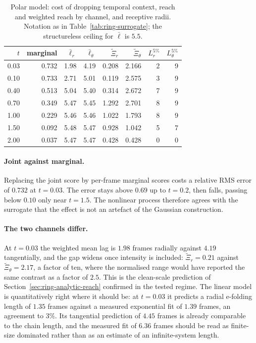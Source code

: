 \begin{table}[t]\centering
\caption{Polar model: cost of dropping temporal context, reach and weighted
reach by channel, and receptive radii. Notation as in
Table~\ref{tab:ring-surrogate}; the structureless ceiling for $\bar\ell$ is
$5.5$.}
\label{tab:ring-response}
\begin{tabular}{@{}rrrrrrrr@{}}
\toprule
$t$ & marginal & $\bar\ell_r$ & $\bar\ell_\theta$
    & $\widetilde\Xi_r$ & $\widetilde\Xi_\theta$
    & $L^{5\%}_r$ & $L^{5\%}_\theta$ \\
\midrule
0.03 & 0.732 & 1.98 & 4.19 & 0.208 & 2.166 & 2 & 9 \\
0.10 & 0.733 & 2.71 & 5.01 & 0.119 & 2.575 & 3 & 9 \\
0.40 & 0.513 & 5.04 & 5.40 & 0.314 & 2.672 & 7 & 9 \\
0.70 & 0.349 & 5.47 & 5.45 & 1.292 & 2.701 & 8 & 9 \\
1.00 & 0.229 & 5.46 & 5.46 & 1.022 & 1.793 & 8 & 9 \\
1.50 & 0.092 & 5.48 & 5.47 & 0.928 & 1.042 & 5 & 7 \\
2.00 & 0.037 & 5.47 & 5.47 & 0.428 & 0.428 & 0 & 0 \\
\bottomrule
\end{tabular}
\end{table}

\paragraph{Joint against marginal.} Replacing the joint score by per-frame
marginal scores costs a relative RMS error of $0.732$ at $t = 0.03$. The error
stays above $0.69$ up to $t = 0.2$, then falls, passing below $0.10$ only near
$t = 1.5$. The nonlinear process therefore agrees with the surrogate that the
effect is not an artefact of the Gaussian construction.

\paragraph{The two channels differ.} At $t = 0.03$ the weighted mean lag is
$1.98$ frames radially against $4.19$ tangentially, and the gap widens once
intensity is included: $\widetilde\Xi_r = 0.21$ against
$\widetilde\Xi_\theta = 2.17$, a factor of ten, where the normalised range
would have reported the same contrast as a factor of $2.5$. This is the
clean-scale prediction of Section~\ref{sec:ring-analytic-reach} confirmed in the
tested regime. The linear model is quantitatively right where it should be: at
$t = 0.03$ it predicts a radial e-folding length of $1.35$ frames against a
measured exponential fit of $1.39$ frames, an agreement to $3\%$. Its
tangential prediction of $4.45$ frames is already comparable to the chain
length, and the measured fit of $6.36$ frames should be read as finite-size
dominated rather than as an estimate of an infinite-system length.

